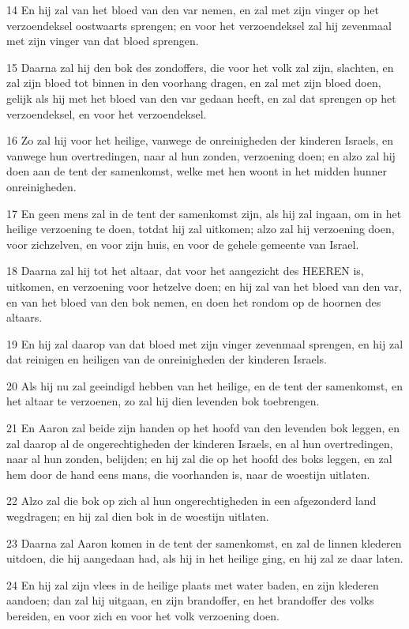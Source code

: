 \par 14 En hij zal van het bloed van den var nemen, en zal met zijn vinger op het verzoendeksel oostwaarts sprengen; en voor het verzoendeksel zal hij zevenmaal met zijn vinger van dat bloed sprengen.
\par 15 Daarna zal hij den bok des zondoffers, die voor het volk zal zijn, slachten, en zal zijn bloed tot binnen in den voorhang dragen, en zal met zijn bloed doen, gelijk als hij met het bloed van den var gedaan heeft, en zal dat sprengen op het verzoendeksel, en voor het verzoendeksel.
\par 16 Zo zal hij voor het heilige, vanwege de onreinigheden der kinderen Israels, en vanwege hun overtredingen, naar al hun zonden, verzoening doen; en alzo zal hij doen aan de tent der samenkomst, welke met hen woont in het midden hunner onreinigheden.
\par 17 En geen mens zal in de tent der samenkomst zijn, als hij zal ingaan, om in het heilige verzoening te doen, totdat hij zal uitkomen; alzo zal hij verzoening doen, voor zichzelven, en voor zijn huis, en voor de gehele gemeente van Israel.
\par 18 Daarna zal hij tot het altaar, dat voor het aangezicht des HEEREN is, uitkomen, en verzoening voor hetzelve doen; en hij zal van het bloed van den var, en van het bloed van den bok nemen, en doen het rondom op de hoornen des altaars.
\par 19 En hij zal daarop van dat bloed met zijn vinger zevenmaal sprengen, en hij zal dat reinigen en heiligen van de onreinigheden der kinderen Israels.
\par 20 Als hij nu zal geeindigd hebben van het heilige, en de tent der samenkomst, en het altaar te verzoenen, zo zal hij dien levenden bok toebrengen.
\par 21 En Aaron zal beide zijn handen op het hoofd van den levenden bok leggen, en zal daarop al de ongerechtigheden der kinderen Israels, en al hun overtredingen, naar al hun zonden, belijden; en hij zal die op het hoofd des boks leggen, en zal hem door de hand eens mans, die voorhanden is, naar de woestijn uitlaten.
\par 22 Alzo zal die bok op zich al hun ongerechtigheden in een afgezonderd land wegdragen; en hij zal dien bok in de woestijn uitlaten.
\par 23 Daarna zal Aaron komen in de tent der samenkomst, en zal de linnen klederen uitdoen, die hij aangedaan had, als hij in het heilige ging, en hij zal ze daar laten.
\par 24 En hij zal zijn vlees in de heilige plaats met water baden, en zijn klederen aandoen; dan zal hij uitgaan, en zijn brandoffer, en het brandoffer des volks bereiden, en voor zich en voor het volk verzoening doen.
